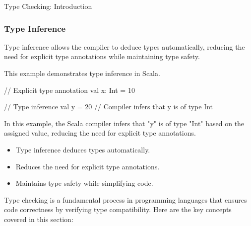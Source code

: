 \begin{notes}{Type Checking: Introduction}
\begin{highlight}
    \end{highlight}
    
    \subsubsection*{Type Inference}
    
    Type inference allows the compiler to deduce types automatically, reducing the need for explicit type annotations while maintaining type safety.
    
    \begin{highlight}
    
        This example demonstrates type inference in Scala.
    
    \begin{code}[Scala]
    // Explicit type annotation
    val x: Int = 10
    
    // Type inference
    val y = 20  // Compiler infers that y is of type Int
    \end{code}
    
        In this example, the Scala compiler infers that "y" is of type "Int" based on the assigned value, reducing the need for explicit type annotations.
    
        \begin{itemize}
            \item Type inference deduces types automatically.
            \item Reduces the need for explicit type annotations.
            \item Maintains type safety while simplifying code.
        \end{itemize}
    
    \end{highlight}
    
    \begin{highlight}
    
        Type checking is a fundamental process in programming languages that ensures code correctness by verifying type compatibility. Here are the key concepts covered in this section:
    

\end{highlight}
\end{notes}
